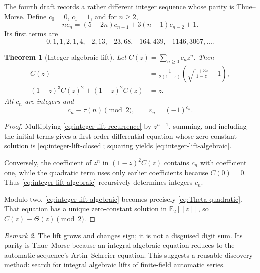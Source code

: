 \documentclass[11pt,oneside]{article}
\numberwithin{equation}{section}
\newtheorem{theorem}{Theorem}[section]
\theoremstyle{definition}
\theoremstyle{remark}
\newtheorem{remark}[theorem]{Remark}
\newcommand{\Ftwo}{\mathbb F_2}
\newcommand{\eps}{\varepsilon}
\begin{document}
The fourth draft records a rather different integer sequence whose parity is
Thue--Morse.  Define \(c_0=0\), \(c_1=1\), and for \(n\ge2\),
\begin{equation}
  nc_n=(5-2n)c_{n-1}+3(n-1)c_{n-2}+1.
  \label{eq:integer-lift-recurrence}
\end{equation}
Its first terms are
\[
 0,1,1,2,1,4,-2,13,-23,68,-164,439,-1146,3067,\ldots .
\]

\begin{theorem}[Integer algebraic lift]
\label{thm:integer-lift}
Let \(C(z)=\sum_{n\ge0}c_nz^n\).  Then
\begin{align}
  C(z)&=\frac{1}{2(1-z)}
   \left(\sqrt{\frac{1+3z}{1-z}}-1\right),
  \label{eq:integer-lift-closed}\\
  (1-z)^3C(z)^2+(1-z)^2C(z)&=z.
  \label{eq:integer-lift-algebraic}
\end{align}
All \(c_n\) are integers and
\begin{equation}
  \boxed{
  c_n\equiv\tau(n)\pmod2,
  \qquad
  \eps_n=(-1)^{c_n}.}
  \label{eq:integer-lift-parity}
\end{equation}
\end{theorem}

\begin{proof}
Multiplying \eqref{eq:integer-lift-recurrence} by \(z^{n-1}\), summing, and
including the initial terms gives a first-order differential equation whose
zero-constant solution is \eqref{eq:integer-lift-closed}; squaring yields
\eqref{eq:integer-lift-algebraic}.

Conversely, the coefficient of \(z^n\) in \((1-z)^2C(z)\) contains \(c_n\)
with coefficient one, while the quadratic term uses only earlier coefficients
because \(C(0)=0\).  Thus \eqref{eq:integer-lift-algebraic} recursively
determines integers \(c_n\).

Modulo two, \eqref{eq:integer-lift-algebraic} becomes precisely
\eqref{eq:Theta-quadratic}.  That equation has a unique zero-constant solution
in \(\Ftwo[[z]]\), so \(C(z)\equiv\Theta(z)\pmod2\).
\end{proof}

\begin{remark}
The lift grows and changes sign; it is not a disguised digit sum.  Its parity
is Thue--Morse because an integral algebraic equation reduces to the automatic
sequence's Artin--Schreier equation.  This suggests a reusable discovery
method: search for integral algebraic lifts of finite-field automatic series.
\end{remark}
\end{document}
